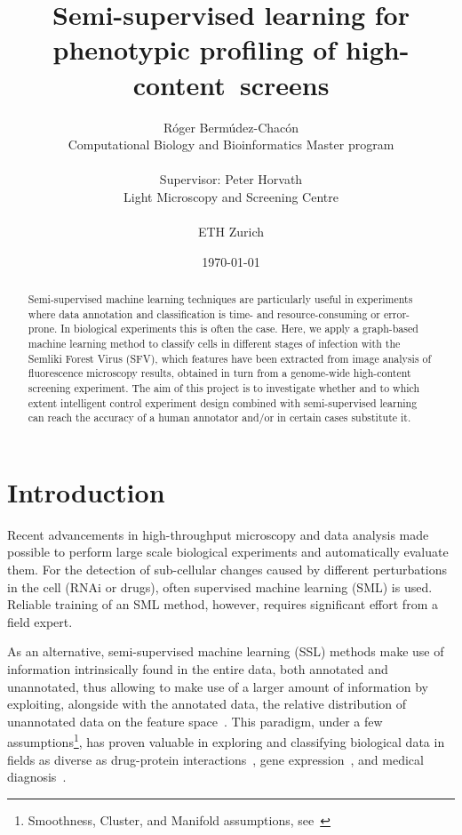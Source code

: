 \documentclass[oneside, a4paper, draft]{memoir} %
\title{
	Semi-supervised learning for phenotypic profiling of \mbox{high-content screens\ifdraft{ (DRAFT)}{\thanks{This
		project was held as a Lab Rotation in Computer Science, as required by the Master program in Computational
		Biology and Bioinformatics - ETH Z\"urich}}}}
\author{
	\ifdraft{Roger Bermudez-Chacon\\Supervisor: Peter Horvath}
	{Róger Bermúdez-Chacón\\\small Computational Biology and Bioinformatics Master program\\\\
			Supervisor: Peter Horvath\\\small Light Microscopy and Screening Centre}\\\\ETH Zurich
}
\date{\today}
\begin{document}
\maketitle
\begin{abstract}
Semi-supervised machine learning techniques are particularly useful in experiments where data annotation and
classification is time- and resource-consuming or error-prone. In biological experiments this is often the case.
Here, we apply a graph-based machine learning method to classify cells in different stages of infection with the
Semliki Forest Virus (SFV), which features have been extracted from image analysis of fluorescence microscopy results,
obtained in turn from a genome-wide high-content screening experiment.
The aim of this project is to investigate whether and to which extent intelligent control experiment design 
combined with semi-supervised learning can reach the accuracy of a human annotator and/or in certain 
cases substitute it.

\end{abstract}
\setcounter{secnumdepth}{0}

\section{Introduction}
Recent advancements in high-throughput microscopy and data analysis made possible to perform large 
scale biological experiments and automatically evaluate them. For the detection of sub-cellular changes 
caused by different perturbations in the cell (RNAi or drugs), often supervised machine learning (SML) 
is used. Reliable training of an SML method, however, requires significant effort from a field expert.

As an alternative, semi-supervised machine learning (SSL) methods make use of information intrinsically found in the 
entire data, both annotated and unannotated, thus allowing to make use of a larger amount of information
by exploiting, alongside with the annotated data, the relative distribution of unannotated data on the feature
space~\cite{chapelle2006semi}.
This paradigm, under a few assumptions\footnote{Smoothness, Cluster, and Manifold assumptions, see~\cite[p.~4-6]{chapelle2006semi}},
has proven valuable in exploring and classifying biological data in fields as diverse as drug-protein
interactions~\cite{zheng2010semi}, gene expression~\cite{costa2007semi}, and medical
diagnosis~\cite{bair2004semi}.
\end{document}
